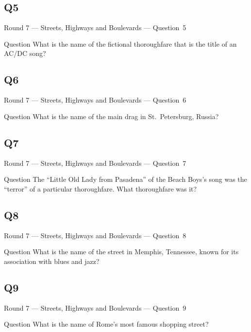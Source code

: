 \documentclass[11pt]{beamer}
\begin{document}
\subsection*{Q5}
\begin{frame}[t]{Round 7 --- Streets, Highways and Boulevards --- \mbox{Question 5}}
\vspace{-0.5em}
\begin{block}{Question}
What is the name of the fictional thoroughfare that is the title of an AC/DC song?
\end{block}
\end{frame}
\subsection*{Q6}
\begin{frame}[t]{Round 7 --- Streets, Highways and Boulevards --- \mbox{Question 6}}
\vspace{-0.5em}
\begin{block}{Question}
What is the name of the main drag in St.\ Petersburg, Russia?
\end{block}
\end{frame}
\subsection*{Q7}
\begin{frame}[t]{Round 7 --- Streets, Highways and Boulevards --- \mbox{Question 7}}
\vspace{-0.5em}
\begin{block}{Question}
The ``Little Old Lady from Pasadena'' of the Beach Boys's song was the ``terror'' of a particular thoroughfare.  What thoroughfare was it?
\end{block}
\end{frame}
\subsection*{Q8}
\begin{frame}[t]{Round 7 --- Streets, Highways and Boulevards --- \mbox{Question 8}}
\vspace{-0.5em}
\begin{block}{Question}
What is the name of the street in Memphis, Tennessee, known for its association with blues and jazz?
\end{block}
\end{frame}
\subsection*{Q9}
\begin{frame}[t]{Round 7 --- Streets, Highways and Boulevards --- \mbox{Question 9}}
\vspace{-0.5em}
\begin{block}{Question}
What is the name of Rome's most famous shopping street?
\end{block}
\end{frame}
\end{document}
